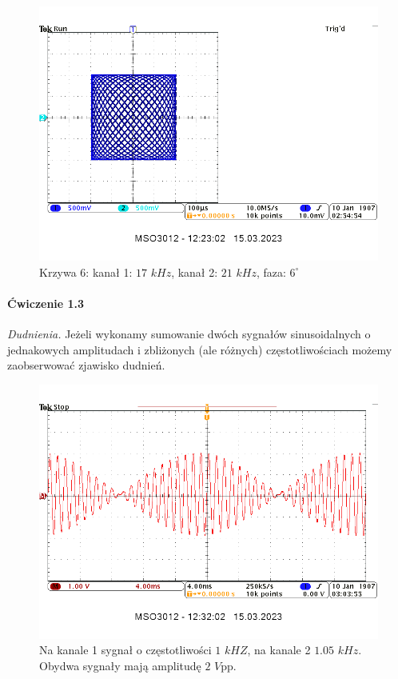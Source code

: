 \documentclass[14pt, table]{extarticle}
\begin{document}
\begin{figure}[H]
\includegraphics[scale=0.55]{A10}
\centering
\captionsetup{labelformat=empty}
\caption{Krzywa 6: kanał 1: $ 17$ $kHz$, kanał 2: $ 21$ $kHz$, faza: $6^{\circ}$}
\end{figure}

\newpage
\paragraph{Ćwiczenie 1.3 \\}
\textit{Dudnienia.} Jeżeli wykonamy sumowanie dwóch sygnałów sinusoidalnych o jednakowych amplitudach i zbliżonych (ale różnych) częstotliwościach możemy zaobserwować zjawisko dudnień.

\begin{figure}[H]
\includegraphics[scale=0.65]{A0}
\centering
\captionsetup{labelformat=empty}
\caption{Na kanale 1 sygnał o częstotliwości $1$ $kHZ$, na kanale 2 $1.05$ $kHz$. Obydwa sygnały mają amplitudę $2$ $V$pp.}
\end{figure}
\end{document}

